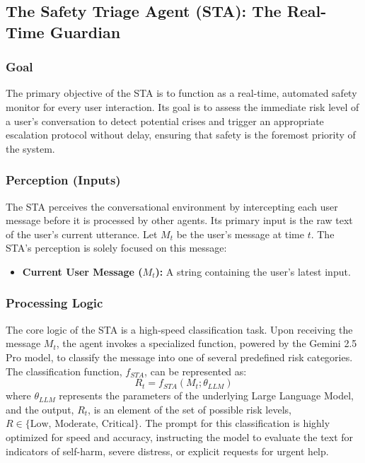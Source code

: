 \subsection{The Safety Triage Agent (STA): The Real-Time Guardian}

\subsubsection{Goal}
The primary objective of the STA is to function as a real-time, automated safety monitor for every user interaction. Its goal is to assess the immediate risk level of a user's conversation to detect potential crises and trigger an appropriate escalation protocol without delay, ensuring that safety is the foremost priority of the system.

\subsubsection{Perception (Inputs)}
The STA perceives the conversational environment by intercepting each user message before it is processed by other agents. Its primary input is the raw text of the user's current utterance. Let $M_t$ be the user's message at time $t$. The STA's perception is solely focused on this message:
\begin{itemize}
    \item \textbf{Current User Message ($M_t$):} A string containing the user's latest input.
\end{itemize}

\subsubsection{Processing Logic}
The core logic of the STA is a high-speed classification task. Upon receiving the message $M_t$, the agent invokes a specialized function, powered by the Gemini 2.5 Pro model, to classify the message into one of several predefined risk categories. The classification function, $f_{STA}$, can be represented as:
$$ R_t = f_{STA}(M_t; \theta_{LLM}) $$
where $\theta_{LLM}$ represents the parameters of the underlying Large Language Model, and the output, $R_t$, is an element of the set of possible risk levels, $R \in \{\text{Low, Moderate, Critical}\}$. The prompt for this classification is highly optimized for speed and accuracy, instructing the model to evaluate the text for indicators of self-harm, severe distress, or explicit requests for urgent help.

